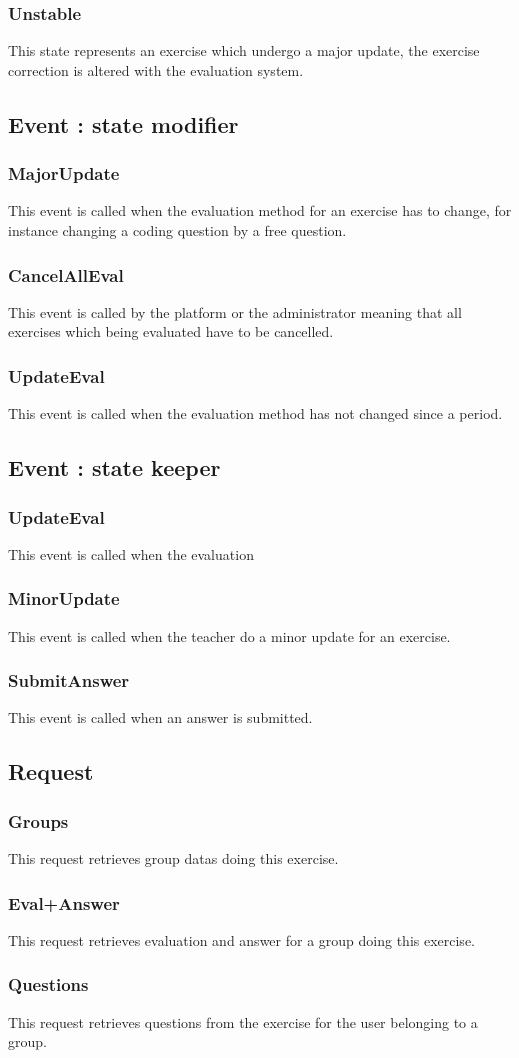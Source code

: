 		\subsubsection{Unstable}
			This state represents an exercise which undergo a major update, the exercise correction is altered with the evaluation system.
	\subsection{Event : state modifier}
		\subsubsection{MajorUpdate}
			This event is called when the evaluation method for an exercise has to change, for instance changing a coding question by a free question.
		\subsubsection{CancelAllEval}
			This event is called by the platform or the administrator meaning that all exercises which being evaluated have to be cancelled.
		\subsubsection{UpdateEval}
			This event is called when the evaluation method has not changed since a period.
	\subsection{Event : state keeper}
		\subsubsection{UpdateEval}
			This event is called when the evaluation 
		\subsubsection{MinorUpdate} 	
			This event is called when the teacher do a minor update for an exercise.
		\subsubsection{SubmitAnswer}
			This event is called when an answer is submitted.
	\subsection{Request}
		\subsubsection{Groups}
			This request retrieves group datas doing this exercise.
		\subsubsection{Eval+Answer}
			This request retrieves evaluation and answer for a group doing this exercise.
		\subsubsection{Questions}
			This request retrieves questions from the exercise for the user belonging to a group.



